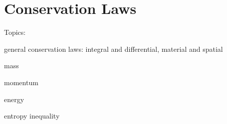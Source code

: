 \chapter{Conservation Laws}
\label{chapter:Conservation-Laws}


Topics:

general conservation laws: integral and differential, material and spatial

mass

momentum

energy

entropy inequality